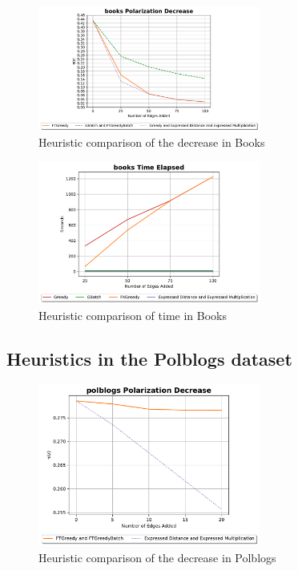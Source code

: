 \begin{figure}[!htbp]
	\centering
	\includegraphics[width=0.65\textwidth]{Figures/books Polarization Decrease}
	\caption{Heuristic comparison of the decrease in Books}
	\label{fig:books_pol}
\end{figure}


\begin{figure}[!htbp]
	\centering
	\includegraphics[width=0.65\textwidth]{Figures/books Time Elapsed}
	\caption{Heuristic comparison of time in Books}
	\label{fig:books_time}
\end{figure}

\subsection{Heuristics in the Polblogs dataset}

\begin{figure}[H]
	\centering
	\includegraphics[width=0.65\textwidth]{Figures/polblogs Polarization Decrease}
	\caption{Heuristic comparison of the decrease in Polblogs}
	\label{fig:polblogs_pol}
\end{figure}


